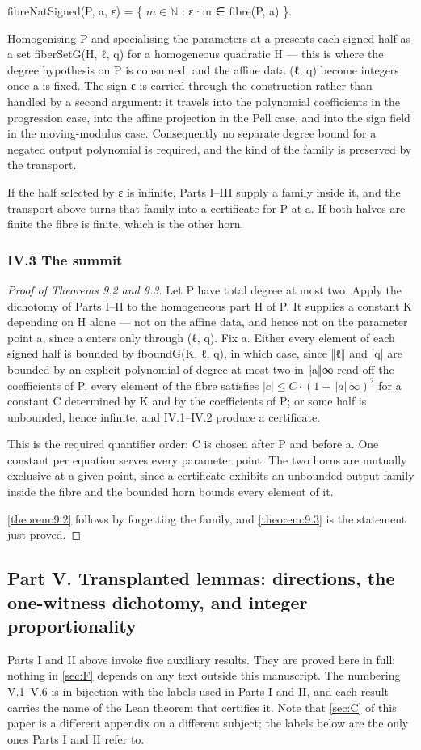 \documentclass[11pt]{article}
\theoremstyle{plain}
\theoremstyle{definition}
\theoremstyle{remark}
\theoremstyle{plain}
\theoremstyle{definition}
\theoremstyle{remark}
\newcounter{Part}
\theoremstyle{plain}
\theoremstyle{definition}
\theoremstyle{remark}
\begin{document}
fibreNatSigned(P, a, ε) = \{ $m ∈ ℕ$ : ε·m ∈ fibre(P, a) \}.

Homogenising P and specialising the parameters at a presents each signed half as a set fiberSetG(H, ℓ, q) for a homogeneous quadratic H — this is where the degree hypothesis on P is consumed, and the affine data (ℓ, q) become integers once a is fixed. The sign ε is carried through the construction rather than handled by a second argument: it travels into the polynomial coefficients in the progression case, into the affine projection in the Pell case, and into the sign field in the moving-modulus case. Consequently no separate degree bound for a negated output polynomial is required, and the kind of the family is preserved by the transport.

If the half selected by ε is infinite, Parts I–III supply a family inside it, and the transport above turns that family into a certificate for P at a. If both halves are finite the fibre is finite, which is the other horn.

\subsubsection*{IV.3 The summit}
\begin{proof}[Proof of Theorems 9.2 and 9.3]
Let P have total degree at most two. Apply the dichotomy of Parts I–II to the homogeneous part H of P. It supplies a constant K depending on H alone — not on the affine data, and hence not on the parameter point a, since a enters only through (ℓ, q). Fix a. Either every element of each signed half is bounded by fboundG(K, ℓ, q), in which case, since ‖ℓ‖ and |q| are bounded by an explicit polynomial of degree at most two in ‖a‖∞ read off the coefficients of P, every element of the fibre satisfies $|c| ≤ C·(1 + ‖a‖∞)^{2}$ for a constant C determined by K and by the coefficients of P; or some half is unbounded, hence infinite, and IV.1–IV.2 produce a certificate.

This is the required quantifier order: C is chosen after P and before a. One constant per equation serves every parameter point. The two horns are mutually exclusive at a given point, since a certificate exhibits an unbounded output family inside the fibre and the bounded horn bounds every element of it.

\cref{theorem:9.2} follows by forgetting the family, and \cref{theorem:9.3} is the statement just proved.

\end{proof}
\subsection*{Part V. Transplanted lemmas: directions, the one-witness dichotomy, and integer proportionality}
Parts I and II above invoke five auxiliary results. They are proved here in full: nothing in \cref{sec:F} depends on any text outside this manuscript. The numbering V.1–V.6 is in bijection with the labels used in Parts I and II, and each result carries the name of the Lean theorem that certifies it. Note that \cref{sec:C} of this paper is a different appendix on a different subject; the labels below are the only ones Parts I and II refer to.
\end{document}
